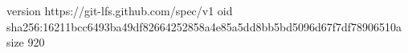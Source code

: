 version https://git-lfs.github.com/spec/v1
oid sha256:16211bcc6493ba49df82664252858a4e85a5dd8bb5bd5096d67f7df78906510a
size 920
